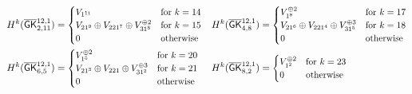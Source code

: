 \begin{align*}
    H^k(\myB_{2,11}) &=
    \scalebox{.95}{$\begin{cases}
        V_{1^{11}} & \text{for $k=14$} \\
        V_{21^{9}} \oplus V_{221^{7}} \oplus V_{31^{8}}^{\oplus 2} & \text{for $k=15$} \\
        0 & \text{otherwise}
    \end{cases}$}
    &
    H^k(\myB_{4,8}) &=
    \scalebox{.95}{$\begin{cases}
        V_{1^{8}}^{\oplus 2} & \text{for $k=17$} \\
        V_{21^{6}} \oplus V_{221^{4}} \oplus V_{31^{5}}^{\oplus 3} & \text{for $k=18$} \\
        0 & \text{otherwise}
    \end{cases}$}
    \\
    H^k(\myB_{6,5}) &=
    \scalebox{.95}{$\begin{cases}
        V_{1^{5}}^{\oplus 2} & \text{for $k=20$} \\
        V_{21^{3}} \oplus V_{221} \oplus V_{31^{2}}^{\oplus 3} & \text{for $k=21$} \\
        0 & \text{otherwise}
    \end{cases}$}
    &
    H^k(\myB_{8,2}) &=
    \scalebox{.95}{$\begin{cases}
      V_{1^{2}}^{\oplus 2} & \text{for $k=23$} \\
      0 & \text{otherwise}
    \end{cases}$}
\end{align*}



